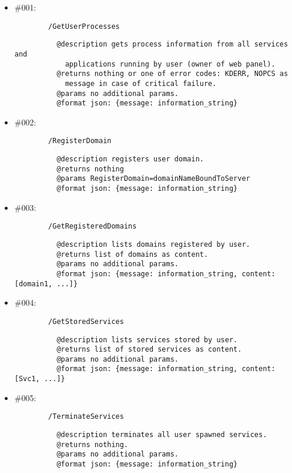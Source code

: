 \documentclass[11pt,a4paper]{scrartcl}
\begin{document}
\begin{description}
\begin{itemize}
        \item \#001:
          \begin{verbatim}
        /GetUserProcesses
          \end{verbatim}
          \begin{verbatim}
          @description gets process information from all services and
            applications running by user (owner of web panel).
          @returns nothing or one of error codes: KDERR, NOPCS as
            message in case of critical failure.
          @params no additional params.
          @format json: {message: information_string}
          \end{verbatim}

        \item \#002:
          \begin{verbatim}
        /RegisterDomain
          \end{verbatim}
          \begin{verbatim}
          @description registers user domain.
          @returns nothing
          @params RegisterDomain=domainNameBoundToServer
          @format json: {message: information_string}
          \end{verbatim}

        \item \#003:
          \begin{verbatim}
        /GetRegisteredDomains
          \end{verbatim}
          \begin{verbatim}
          @description lists domains registered by user.
          @returns list of domains as content.
          @params no additional params.
          @format json: {message: information_string, content: [domain1, ...]}
          \end{verbatim}

        \item \#004:
          \begin{verbatim}
        /GetStoredServices
          \end{verbatim}
          \begin{verbatim}
          @description lists services stored by user.
          @returns list of stored services as content.
          @params no additional params.
          @format json: {message: information_string, content: [Svc1, ...]}
          \end{verbatim}

        \item \#005:
          \begin{verbatim}
        /TerminateServices
          \end{verbatim}
          \begin{verbatim}
          @description terminates all user spawned services.
          @returns nothing.
          @params no additional params.
          @format json: {message: information_string}
          \end{verbatim}


\end{itemize}
\end{description}
\end{document}
